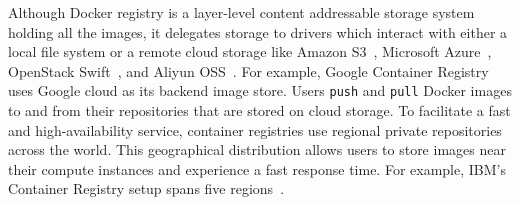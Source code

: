 Although Docker registry is a layer-level content addressable storage system holding all the images,
it delegates storage to drivers which interact with either a local file system or a remote cloud storage like Amazon S3~\cite{s3}, Microsoft Azure~\cite{azure}, OpenStack Swift~\cite{swift}, and Aliyun OSS~\cite{aliyun}. 
For example, Google Container Registry~\cite{GoogleContainerRegistry} uses Google cloud 
as its backend image store.
Users \texttt{push} and \texttt{pull} Docker images to and from their repositories that are stored on cloud storage. 
To facilitate a fast and high-availability service, container registries use regional private repositories across the world.  
This geographical distribution allows users to store images near their compute instances and experience a fast response time. 
For example, IBM's Container Registry setup spans five regions~\cite{dockerworkload}. 

%

